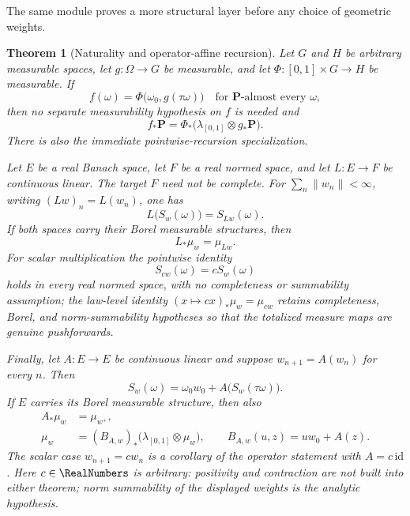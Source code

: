 \documentclass[11pt,oneside]{article}
\newtheorem{theorem}{Theorem}[section]
\theoremstyle{definition}
\theoremstyle{remark}
\begin{document}
The same module proves a more structural layer before any choice of geometric weights.

\begin{theorem}[Naturality and operator-affine recursion]
\label{thm:weighted-law-naturality}
Let \(G\) and \(H\) be arbitrary measurable spaces, let \(g:\Omega\to G\) be measurable,
and let \(\Phi:[0,1]\times G\to H\) be measurable.  If
\[
 f(\omega)=\Phi\bigl(\omega_0,g(\tau\omega)\bigr)
 \quad\text{for \(\mathbf P\)-almost every \(\omega\)},
\]
then no separate measurability hypothesis on \(f\) is needed and
\begin{equation}
 f_*\mathbf P=\Phi_*\bigl(\lambda_{[0,1]}\otimes g_*\mathbf P\bigr).
 \label{eq:ae-head-tail-recursion}
\end{equation}
There is also the immediate pointwise-recursion specialization.

Let \(E\) be a real Banach space, let \(F\) be a real normed space, and let
\(L:E\to F\) be continuous linear.  The target \(F\) need not be complete.  For
\(\sum_n\lVert w_n\rVert<\infty\), writing \((Lw)_n=L(w_n)\), one has
\begin{equation}
 L\bigl(S_w(\omega)\bigr)=S_{Lw}(\omega).
 \label{eq:weighted-series-naturality}
\end{equation}
If both spaces carry their Borel measurable structures, then
\begin{equation}
 L_*\mu_w=\mu_{Lw}.
 \label{eq:weighted-law-naturality}
\end{equation}
For scalar multiplication the pointwise identity
\begin{equation}
 S_{cw}(\omega)=cS_w(\omega)                              \label{eq:weighted-series-smul}
\end{equation}
holds in every real normed space, with no completeness or summability assumption; the
law-level identity \((x\mapsto cx)_*\mu_w=\mu_{cw}\) retains completeness, Borel, and
norm-summability hypotheses so that the totalized measure maps are genuine pushforwards.

Finally, let \(A:E\to E\) be continuous linear and suppose
\(w_{n+1}=A(w_n)\) for every \(n\).  Then
\begin{equation}
 S_w(\omega)=\omega_0w_0+A\bigl(S_w(\tau\omega)\bigr).
 \label{eq:weighted-operator-split}
\end{equation}
If \(E\) carries its Borel measurable structure, then also
\begin{align}
 A_*\mu_w&=\mu_{w^+},                                      \label{eq:weighted-shift-map}\\
 \mu_w&=(B_{A,w})_*\bigl(\lambda_{[0,1]}\otimes\mu_w\bigr),
 \qquad B_{A,w}(u,z)=u w_0+A(z).                           \label{eq:weighted-operator-law}
\end{align}
The scalar case \(w_{n+1}=c w_n\) is a corollary of the operator statement with
\(A=c\,\mathrm{id}\).  Here \(c\in\RealNumbers\) is arbitrary: positivity and contraction are not
built into either theorem; norm summability of the displayed weights is the analytic
hypothesis.
\end{theorem}
\end{document}
